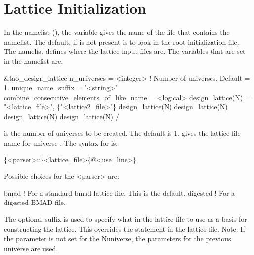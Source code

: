 \section{Lattice Initialization}
\label{s:init.lat} 

In the  namelist (), the  variable gives the name
of the file that contains the  namelist. The default, if  is
not present is to look in the \tao root initialization file. The  namelist
defines where the lattice input files are. The variables that are set in the 
namelist are:
\begin{example}
  &tao_design_lattice
    n_universes        = <integer>      ! Number of universes. Default = 1.
    unique_name_suffix = "<string>"
    combine_consecutive_elements_of_like_name = <logical>
    design_lattice(N) = "<lattice_file>", \{"<lattice2_file>"\}
    design_lattice(N)%
    design_lattice(N)%
    design_lattice(N)%
    design_lattice(N)%
  /
\end{example}

 is the number of universes to be created. The default is 1.  
gives the lattice file name for universe . The syntax for  is:
\begin{example}
  \{<parser>::\}<lattice_file>\{@<use_line>\}
\end{example}
Possible choices for the <parser> are:
\begin{example}
  bmad      ! For a standard bmad lattice file. This is the default.
  digested  ! For a digested BMAD file.
\end{example}
The  optional suffix is used to specify what  in the lattice file to use as
a basis for constructing the lattice. This overrides the  statement in the lattice file.
Note: If the  parameter is not set for the N\Th universe, the parameters for the 
previous universe are used.

